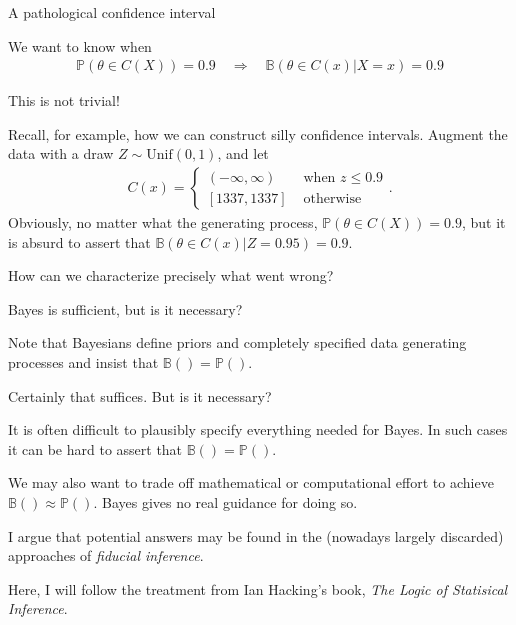 \documentclass[8pt]{beamer}\usepackage[]{graphicx}\usepackage[]{color}
\def\p#1{\mathbb{P}\left(#1\right)}
\def\b#1{\mathbb{B}\left(#1\right)}
\begin{document}
\begin{frame}{A pathological confidence interval}

We want to know when
%
\begin{align*}
%
\p{\theta \in C(X)} = 0.9 \quad \Rightarrow \quad
\b{\theta \in C(x) | X = x} = 0.9
%
\end{align*}

This is not trivial!

\pause

Recall, for example, how we can construct silly confidence
intervals. Augment the data with a draw $Z \sim \mathrm{Unif}(0, 1)$, and let
%
\begin{align*}
%
C(x) =
\begin{cases}
    (-\infty, \infty) & \textrm{ when } z \le 0.9 \\
    [1337, 1337] & \textrm{ otherwise }
\end{cases}.
%
\end{align*}
%
Obviously, no matter what the generating process, $\p{\theta \in C(X)} = 0.9$,
but it is absurd to assert that $\b{\theta \in C(x) | Z = 0.95} = 0.9$.

\pause

How can we characterize precisely what went wrong?

\end{frame}





\begin{frame}{Bayes is sufficient, but is it necessary?}

Note that Bayesians define priors and completely specified
data generating processes and insist that $\b{} = \p{}$.

Certainly that suffices.  But is it necessary?

\pause

It is often difficult to plausibly specify
everything needed for Bayes.  In such cases it can be hard to
assert that $\b{} = \p{}$.

\pause

We may also want to trade off mathematical or computational effort to achieve
$\b{} \approx \p{}$.  Bayes gives no real guidance for doing so.

\pause

I argue that potential answers may be found in the (nowadays largely discarded)
approaches of {\em fiducial inference}.

Here, I will follow the treatment from Ian Hacking's book, {\em The Logic of
Statisical Inference}.

\end{frame}
\end{document}
